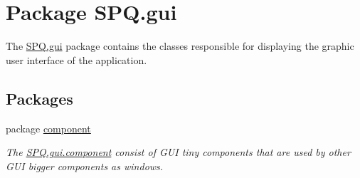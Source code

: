 \hypertarget{namespace_s_p_q_1_1gui}{}\section{Package S\+P\+Q.\+gui}
\label{namespace_s_p_q_1_1gui}


The \mbox{\hyperlink{namespace_s_p_q_1_1gui}{S\+P\+Q.\+gui}} package contains the classes responsible for displaying the graphic user interface of the application.  


\subsection*{Packages}
\begin{DoxyCompactItemize}
\item 
package \mbox{\hyperlink{namespace_s_p_q_1_1gui_1_1component}{component}}
\begin{DoxyCompactList}\small\item\em The \mbox{\hyperlink{namespace_s_p_q_1_1gui_1_1component}{S\+P\+Q.\+gui.\+component}} consist of G\+UI tiny components that are used by other G\+UI bigger components as windows. \end{DoxyCompactList}\end{DoxyCompactItemize}
